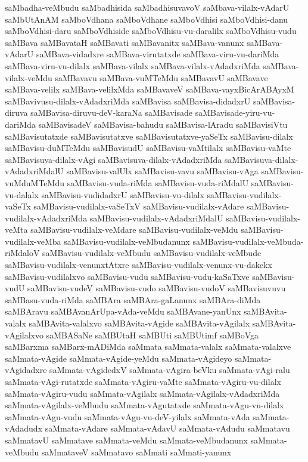 {saMbadha-veMbudu
saMbadhisida
saMbadhisuvavoV
saMbava-vilalx-vAdarU
saMbUtAnAM
saMboVdhana
saMboVdhane
saMboVdhisi
saMboVdhisi-danu
saMboVdhisi-daru
saMboVdhiside
saMboVdhisu-vu-daralilx
saMboVdhisu-vudu
saMBava
saMBavataH
saMBavati
saMBavanitx
saMBava-vanunx
saMBava-vAdarU
saMBava-vidadxre
saMBava-virutatxde
saMBava-viru-vu-dariMda
saMBava-viru-vu-dilalx
saMBava-vilalx
saMBava-vilalx-vAdadxriMda
saMBava-vilalx-veMdu
saMBavavu
saMBava-vuMTeMdu
saMBavavU
saMBavave
saMBava-velilx
saMBava-velilxMda
saMBavaveV
saMBava-vayxBicArABAyxM
saMBavivusu-dilalx-vAdadxriMda
saMBavisa
saMBavisa-didadxrU
saMBavisa-diruva
saMBavisa-diruvu-deV-karaNa
saMBavisade
saMBavisade-yiru-vu-dariMda
saMBavisadeV
saMBavisa-bahudu
saMBavisa-lAradu
saMBavisiVtu
saMBavisutatxde
saMBavisutatxve
saMBavisutatxve-yaSeTx
saMBavisu-dilalx
saMBavisu-duMTeMdu
saMBavisudU
saMBavisu-vaMtilalx
saMBavisu-vaMte
saMBavisuva-dilalx-vAgi
saMBavisuva-dilalx-vAdadxriMda
saMBavisuva-dilalx-vAdadxriMdalU
saMBavisu-valUlx
saMBavisu-vavu
saMBavisu-vAga
saMBavisu-vuMduMTeMdu
saMBavisu-vuda-riMda
saMBavisu-vuda-riMdalU
saMBavisu-vu-dalalx
saMBavisu-vudidadxrU
saMBavisu-vu-dilalx
saMBavisu-vudilalx-vaSeTx
saMBavisu-vudilalx-vaSeTxV
saMBavisu-vudilalx-vAdare
saMBavisu-vudilalx-vAdadxriMda
saMBavisu-vudilalx-vAdadxriMdalU
saMBavisu-vudilalx-veMta
saMBavisu-vudilalx-veMdare
saMBavisu-vudilalx-veMdu
saMBavisu-vudilalx-veMba
saMBavisu-vudilalx-veMbudanunx
saMBavisu-vudilalx-veMbuda-riMdaloV
saMBavisu-vudilalx-veMbudu
saMBavisu-vudilalx-veMbude
saMBavisu-vudilalx-venunxtAtxre
saMBavisu-vudilalx-venunx-vu-dakekx
saMBavisu-vudilalxvo
saMBavisu-vudu
saMBavisu-vudu-kaSaTxve
saMBavisu-vudU
saMBavisu-vudeV
saMBavisu-vudo
saMBavisu-vudoV
saMBavisuvuvu
saMBasu-vuda-riMda
saMBAra
saMBAra-gaLanunx
saMBAra-diMda
saMBAravu
saMBAvanArUpa-vAda-veMdu
saMBAvane-yanUnx
saMBAvita-valalx
saMBAvita-valalxvo
saMBAvita-vAgide
saMBAvita-vAgilalx
saMBAvita-vAgilalxvo
saMBASaNe
saMBUtaH
saMBUti
saMBUtimf
saMBoVga
saMBarxma
saMBarx-mADiMda
saMmata
saMmata-valalx
saMmata-valalxve
saMmata-vAgide
saMmata-vAgide-yeMdu
saMmata-vAgideyo
saMmata-vAgidadxre
saMmata-vAgidedxV
saMmata-vAgira-beVku
saMmata-vAgi-ralu
saMmata-vAgi-rutatxde
saMmata-vAgiru-vaMte
saMmata-vAgiru-vu-dilalx
saMmata-vAgiru-vudu
saMmata-vAgilalx
saMmata-vAgilalx-vAdadxriMda
saMmata-vAgilalx-veMbudu
saMmata-vAgutatxde
saMmata-vAgu-vu-dilalx
saMmata-vAgu-vudu
saMmata-vAgu-vu-deV-yilalx
saMmata-vAda
saMmata-vAdadudx
saMmata-vAdare
saMmata-vAdavU
saMmata-vAdudu
saMmatavu
saMmatavU
saMmatave
saMmata-veMdu
saMmata-veMbudanunx
saMmata-veMbudu
saMmataveV
saMmatavo
saMmati
saMmati-yanunx
}
